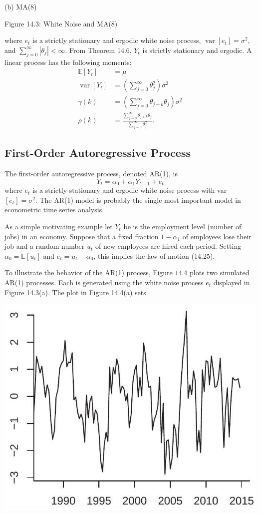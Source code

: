 \documentclass[10pt]{article}
\begin{document}
(b) MA(8)

Figure 14.3: White Noise and MA(8)

where $e_{t}$ is a strictly stationary and ergodic white noise process, $\operatorname{var}\left[e_{t}\right]=\sigma^{2}$, and $\sum_{j=0}^{\infty}\left|\theta_{j}\right|<\infty$. From Theorem 14.6, $Y_{t}$ is strictly stationary and ergodic. A linear process has the following moments:
$$
\begin{aligned}
\mathbb{E}\left[Y_{t}\right] &=\mu \\
\operatorname{var}\left[Y_{t}\right] &=\left(\sum_{j=0}^{\infty} \theta_{j}^{2}\right) \sigma^{2} \\
\gamma(k) &=\left(\sum_{j=0}^{\infty} \theta_{j+k} \theta_{j}\right) \sigma^{2} \\
\rho(k) &=\frac{\sum_{j=0}^{\infty} \theta_{j+k} \theta_{j}}{\sum_{j=0}^{\infty} \theta_{j}^{2}} .
\end{aligned}
$$

\subsection{First-Order Autoregressive Process}
The first-order autoregressive process, denoted AR(1), is
$$
Y_{t}=\alpha_{0}+\alpha_{1} Y_{t-1}+e_{t}
$$
where $e_{t}$ is a strictly stationary and ergodic white noise process with var $\left[e_{t}\right]=\sigma^{2}$. The AR(1) model is probably the single most important model in econometric time series analysis.

As a simple motivating example let $Y_{t}$ be is the employment level (number of jobs) in an economy. Suppose that a fixed fraction $1-\alpha_{1}$ of employees lose their job and a random number $u_{t}$ of new employees are hired each period. Setting $\alpha_{0}=\mathbb{E}\left[u_{t}\right]$ and $e_{t}=u_{t}-\alpha_{0}$, this implies the law of motion (14.25).

To illustrate the behavior of the AR(1) process, Figure $14.4$ plots two simulated AR(1) processes. Each is generated using the white noise process $e_{t}$ displayed in Figure 14.3(a). The plot in Figure 14.4(a) sets

\includegraphics[max width=\textwidth]{2022_10_23_6047885e7d154c9f28afg-24}
\end{document}

